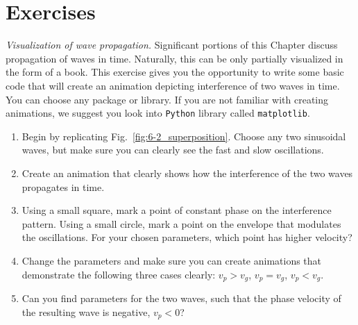 \newpage

\section{Exercises}

\begin{exercise}
\emph{Visualization of wave propagation.}
Significant portions of this Chapter discuss propagation of waves in time. Naturally, this can be only partially visualized in the form of a book. This exercise gives you the opportunity to write some basic code that will create an animation depicting interference of two waves in time. You can choose any package or library. If you are not familiar with creating animations, we suggest you look into {\tt Python} library called {\tt matplotlib}.
\begin{enumerate}[label=(\alph*)]
    \item Begin by replicating Fig.~\ref{fig:6-2_superposition}. Choose any two sinusoidal waves, but make sure you can clearly see the fast and slow oscillations.
    \item Create an animation that clearly shows how the interference of the two waves propagates in time.
    \item Using a small square, mark a point of constant phase on the interference pattern. Using a small circle, mark a point on the envelope that modulates the oscillations. For your chosen parameters, which point has higher velocity?
    \item Change the parameters and make sure you can create animations that demonstrate the following three cases clearly: $v_p>v_g$, $v_p=v_g$, $v_p<v_g$.
    \item Can you find parameters for the two waves, such that the phase velocity of the resulting wave is negative, $v_p<0$?
\end{enumerate}
\end{exercise}

